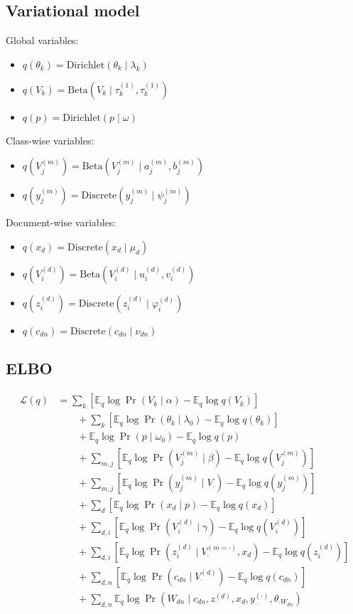 \documentclass{article}
\newcommand{\Beta}{\ensuremath{\mathrm{Beta}}}
\newcommand{\Dirichlet}{\ensuremath{\mathrm{Dirichlet}}}
\newcommand{\Discrete}{\ensuremath{\mathrm{Discrete}}}
\newcommand{\Eq}{\ensuremath{\mathbb{E}_q\xspace}}
\newcommand{\Lq}{\ensuremath{\mathcal{L}(q)}}
\begin{document}
\subsection*{Variational model}

Global variables:
\begin{itemize}
\item $\displaystyle q(\theta_k) = \Dirichlet(\theta_k \mid \lambda_k)$
\item $\displaystyle q(V_k) = \Beta(V_k \mid \tau_k^{(1)}, \tau_k^{(1)})$
\item $q(p) = \Dirichlet(p \mid \omega)$
\end{itemize}
Class-wise variables:
\begin{itemize}
\item $\displaystyle q(V_j^{(m)}) = \Beta(V_j^{(m)} \mid a_j^{(m)}, b_j^{(m)})$
\item $q(y_j^{(m)}) = \Discrete(y_j^{(m)} \mid \psi_j^{(m)})$
\end{itemize}
Document-wise variables:
\begin{itemize}
\item $q(x_d) = \Discrete(x_d \mid \mu_d)$
\item $\displaystyle q(V_i^{(d)}) = \Beta(V_i^{(d)} \mid u_i^{(d)}, v_i^{(d)})$
\item $q(z_i^{(d)}) = \Discrete(z_i^{(d)} \mid \varphi_i^{(d)})$
\item $\displaystyle q(c_{dn}) = \Discrete(c_{dn} \mid \nu_{dn})$
\end{itemize}


\subsection*{ELBO}

\begin{align*}
\Lq
    &= \sum_k \left[ \Eq \log \Pr(V_k \mid \alpha) - \Eq \log q(V_k) \right] \\
    &\qquad + \sum_k \left[ \Eq \log \Pr(\theta_k \mid \lambda_0) - \Eq \log q(\theta_k) \right] \\
    &\qquad + \Eq \log \Pr(p \mid \omega_0) - \Eq \log q(p) \\
    &\qquad + \sum_{m,j} \left[ \Eq \log \Pr(V_j^{(m)} \mid \beta) - \Eq \log q(V_j^{(m)}) \right] \\
    &\qquad + \sum_{m,j} \left[ \Eq \log \Pr(y_j^{(m)} \mid V_\cdot) - \Eq \log q(y_j^{(m)}) \right] \\
    &\qquad + \sum_d \left[ \Eq \log \Pr(x_d \mid p) - \Eq \log q(x_d) \right] \\
    &\qquad + \sum_{d,i} \left[ \Eq \log \Pr(V_i^{(d)} \mid \gamma) - \Eq \log q(V_i^{(d)}) \right] \\
    &\qquad + \sum_{d,i} \left[ \Eq \log \Pr(z_i^{(d)} \mid V^{(m=\cdot)}_\cdot, x_d) - \Eq \log q(z_i^{(d)}) \right] \\
    &\qquad + \sum_{d,n} \left[ \Eq \log \Pr(c_{dn} \mid V^{(d)}_\cdot) - \Eq \log q(c_{dn}) \right] \\
    &\qquad + \sum_{d,n} \Eq \log \Pr(W_{dn} \mid c_{dn}, z_\cdot^{(d)}, x_d, y_\cdot^{(\cdot)}, \theta_{\cdot W_{dn}})
\end{align*}
\end{document}
